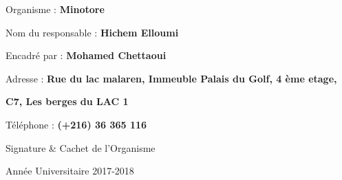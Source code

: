\documentclass[12pt,a4paper,oneside]{report}
\begin{document}
{{\selectfont   Organisme :}}
 {\textbf{Minotore}} 
 
 {{\selectfont  Nom du responsable :}}
 {\textbf{ Hichem Elloumi }} 
 
 {{\selectfont  Encadré par :}}
 {\textbf{ Mohamed Chettaoui }} 
 
{{\selectfont   Adresse :}}
 {\textbf{ Rue du lac malaren, Immeuble Palais du Golf, 4 ème etage,}}
 
 {\textbf{  C7, Les berges du LAC 1}} 

{{\selectfont   Téléphone :}}
 {\textbf{ (+216) 36 365 116} }
 
\begin{flushright}
Signature \& Cachet de l'Organisme
\end{flushright}

\textbf{}
\textbf{}
\textbf{}
\newline
\newline

\begin{center}
Année Universitaire 2017-2018
\end{center} 

 \setcounter{page}{1}


 \tableofcontents
\listoffigures
 \cleardoublepage 
\newpage
 \setcounter{page}{1}
\pagestyle{fancy}
\renewcommand{\thesection}{\arabic{section}}
\renewcommand\headrulewidth{1pt}

\fancyhead[R]{}

\fancyhead[L]{\leftmark}
\pagestyle{fancy}
\renewcommand\headrulewidth{1pt}
\fancyhead[L]{\leftmark}
\renewcommand\footrulewidth{1pt}
{}



\clearpage
\end{document}
